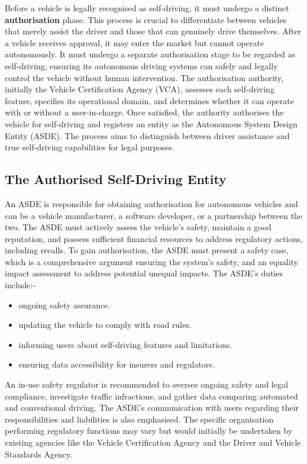 \documentclass[12pt]{report} %
\begin{document}
			Before a vehicle is legally recognised as self-driving, it must undergo a distinct \textbf{authorisation} phase. This process is crucial to differentiate between vehicles that merely assist the driver and those that can genuinely drive themselves. After a vehicle receives approval, it may enter the market but cannot operate autonomously. It must undergo a separate authorisation stage to be regarded as self-driving, ensuring its autonomous driving systems can safely and legally control the vehicle without human intervention. The authorisation authority, initially the Vehicle Certification Agency (VCA), assesses each self-driving feature, specifies its operational domain, and determines whether it can operate with or without a user-in-charge. Once satisfied, the authority authorises the vehicle for self-driving and registers an entity as the Autonomous System Design Entity (ASDE). The process aims to distinguish between driver assistance and true self-driving capabilities for legal purposes.

			\subsection*{The Authorised Self-Driving Entity}
				An ASDE is responsible for obtaining authorisation for autonomous vehicles and can be a vehicle manufacturer, a software developer, or a partnership between the two. The ASDE must actively assess the vehicle's safety, maintain a good reputation, and possess sufficient financial resources to address regulatory actions, including recalls. To gain authorisation, the ASDE must present a safety case, which is a comprehensive argument ensuring the system's safety, and an equality impact assessment to address potential unequal impacts. The ASDE's duties include:-

                \begin{itemize}
                    \item ongoing safety assurance.
                    \item updating the vehicle to comply with road rules.
                    \item informing users about self-driving features and limitations.
                    \item ensuring data accessibility for insurers and regulators.
                \end{itemize}

                An in-use safety regulator is recommended to oversee ongoing safety and legal compliance, investigate traffic infractions, and gather data comparing automated and conventional driving. The ASDE's communication with users regarding their responsibilities and liabilities is also emphasised. The specific organisation performing regulatory functions may vary but would initially be undertaken by existing agencies like the Vehicle Certification Agency and the Driver and Vehicle Standards Agency.~\cite{govuk_automated_2022}
\end{document}
